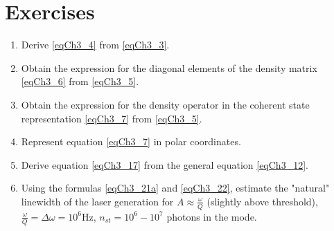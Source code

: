 \section{Exercises}
\begin{enumerate}
\item Derive \eqref{eqCh3_4} from \eqref{eqCh3_3}.
\item Obtain the expression for the diagonal elements of the density matrix \eqref{eqCh3_6} from \eqref{eqCh3_5}.
\item Obtain the expression for the density operator in the coherent state representation \eqref{eqCh3_7} from \eqref{eqCh3_5}.
\item Represent equation \eqref{eqCh3_7} in polar coordinates.
\item Derive equation \eqref{eqCh3_17} from the general equation \eqref{eqCh3_12}.
\item Using the formulas \eqref{eqCh3_21a} and \eqref{eqCh3_22}, estimate the "natural" linewidth of the laser generation for $A \approx \frac{\omega}{Q}$ (slightly above threshold), 
$\frac{\omega}{Q} = \Delta \omega = 10^6 \mbox{Hz}$, 
$n_{st} = 10^6 - 10^7$ photons in the mode. 
\end{enumerate}